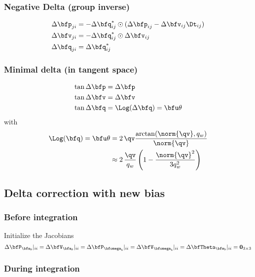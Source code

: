\subsubsection{Negative Delta (group inverse)}

\begin{align}
\begin{split}
\Dp_{ji} 
&= -\Dq_{ij}^*\od(\Dp_{ij} - \Dv_{ij}\Dt_{ij}) \\
\Dv_{ji} 
&= -\Dq_{ij}^*\od\Dv_{ij} \\
\Dq_{ji} 
&= \Dq_{ij}^*
\end{split}
\end{align}

\subsubsection{Minimal delta (in tangent space)}

%
\begin{align}
\begin{split}
\tan{\Dp} &= \Dp \\
\tan{\Dv} &= \Dv \\
\tan{\Dq} &= \Log(\Dq) = \bfu\theta 
\end{split}
\end{align}
%
with
%
\begin{align*}
\Log(\bfq) = \bfu\theta &= 2\,\qv\frac{\arctan({\norm{\qv},q_w})}{\norm{\qv}} \\
&\approx 2\,\frac{\qv}{q_w} \left(1 - \frac{\norm{\qv}^2}{3q_w^2}\right)
\end{align*}


\subsection{Delta correction with new bias}

\subsubsection{Before integration}

Initialize the Jacobians
%
\begin{equation}
\DP_{\ab}|_{ii} = \DV_{\ab}|_{ii} = \DP_{\wb}|_{ii} = \DV_{\wb}|_{ii} = \DTH_{\bfw_b}|_{ii} = {\bf0}_{3\times3}
\end{equation}
%

\subsubsection{During integration}

